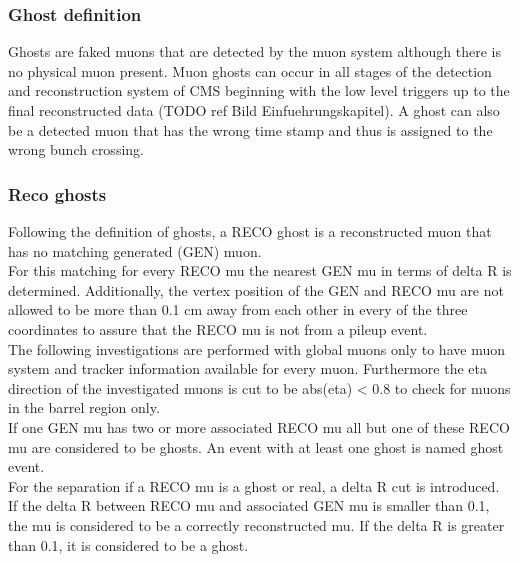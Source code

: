 \subsubsection{Ghost definition}
Ghosts are faked muons that are detected by the muon system although there is no physical muon present.
Muon ghosts can occur in all stages of the detection and reconstruction system of CMS beginning with the low level triggers up to the final reconstructed data (TODO ref Bild Einfuehrungskapitel).
A ghost can also be a detected muon that has the wrong time stamp and thus is assigned to the wrong bunch crossing.

\subsubsection{Reco ghosts}
Following the definition of ghosts, a RECO ghost is a reconstructed muon that has no matching generated (GEN) muon.\\
For this matching for every RECO mu the nearest GEN mu in terms of delta R is determined. Additionally, the vertex position of the GEN and RECO mu are not allowed to be more than 0.1 cm away from each other in every of the three coordinates to assure that the RECO mu is not from a pileup event.\\
The following investigations are performed with global muons only to have muon system and tracker information available for every muon. Furthermore the eta direction of the investigated muons is cut to be abs(eta) < 0.8 to check for muons in the barrel region only.\\
If one GEN mu has two or more associated RECO mu all but one of these RECO mu are considered to be ghosts. An event with at least one ghost is named ghost event.\\
For the separation if a RECO mu is a ghost or real, a delta R cut is introduced. If the delta R between RECO mu and associated GEN mu is smaller than 0.1, the mu is considered to be a correctly reconstructed mu. If the delta R is greater than 0.1, it is considered to be a ghost.

